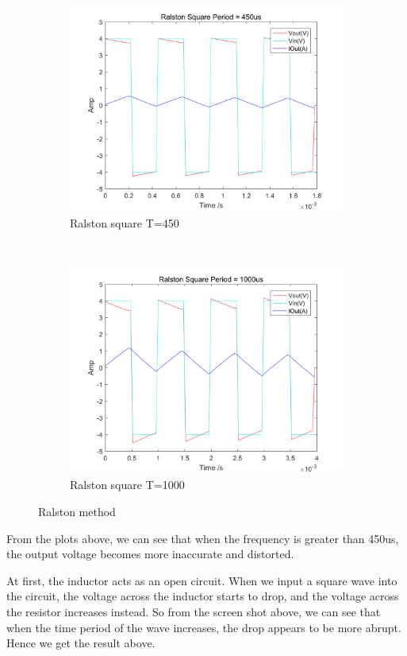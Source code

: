 \documentclass[a4paper, 12pt]{article}
\begin{document}
\begin{figure}[h]
\begin{subfigure}[b]{0.4\textwidth}
            \includegraphics[width=\textwidth]{ex1/new_ralston_square_450.png}
            \caption{Ralston square T=450}
      \end{subfigure}
       ~
      \begin{subfigure}[b]{0.4\textwidth}
            \includegraphics[width=\textwidth]{ex1/new_ralston_square_1000.png}
            \caption{Ralston square T=1000}
      \end{subfigure}
      \caption{Ralston method}
\end{figure}
From the plots above, we can see that when the frequency is greater than 450us, the output voltage becomes more inaccurate and distorted.\par
\vspace{5mm}
At first, the inductor acts as an open circuit. When we input a square wave into the circuit, the voltage across the inductor starts to drop, and the voltage across the resistor increases instead. So from the screen shot above, we can see that when the time period of the wave increases, the drop appears to be more abrupt. Hence we get the result above.\cite{waveformoutput}
\newpage
\end{document}
